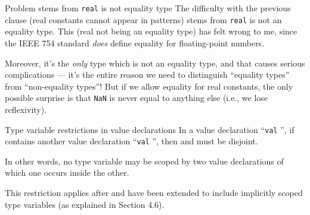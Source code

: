 \begin{remark}{Problem stems from \texttt{real} is not equality type}
The difficulty with the previous clause (real constants cannot appear in
patterns) stems from \texttt{real} is not an equality type. This (real
not being an equality type) has felt wrong to me, since the IEEE 754
standard \emph{does} define equality for floating-point
numbers.

Moreover, it's the \emph{only} type which is not an equality
type, and that causes serious complications --- it's the entire reason we
need to distinguish ``equality types'' from ``non-equality types''! But
if we allow equality for real constants, the only possible surprise is
that \texttt{NaN} is never equal to anything else (i.e., we lose
reflexivity). 
\end{remark}

\begin{clause}{Type variable restrictions in value declarations}
In a value declaration ``\texttt{val}  '', if
 contains another value declaration ``\texttt{val} 
'', then  and  must be disjoint.

In other words, no type variable may be scoped by two value declarations
of which one occurs inside the other.

This restriction applies after  and  have been
extended to include implicitly scoped type variables (as explained in
Section 4.6).
\end{clause}